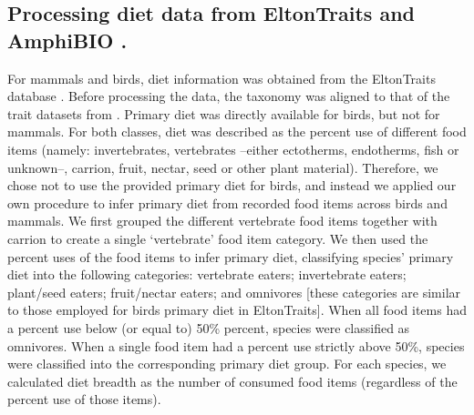\documentclass[11pt]{article}
\begin{document}

\subsection{Processing diet data from EltonTraits \citep{Wilman2014} and AmphiBIO \citep{Oliveira2017}.}
For mammals and birds, diet information was obtained from the EltonTraits database \citep{Wilman2014}. Before processing the data, the taxonomy was aligned to that of the trait datasets from \citep{Etard2020}. Primary diet was directly available for birds, but not for mammals. For both classes, diet was described as the percent use of different food items (namely: invertebrates, vertebrates --either ectotherms, endotherms, fish or unknown--, carrion, fruit, nectar, seed or other plant material). Therefore, we chose not to use the provided primary diet for birds, and instead we applied our own procedure to infer primary diet from recorded food items across birds and mammals. We first grouped the different vertebrate food items together with carrion to create a single `vertebrate' food item category. We then used the percent uses of the food items to infer primary diet, classifying species’ primary diet into the following categories: vertebrate eaters; invertebrate eaters; plant/seed eaters; fruit/nectar eaters; and omnivores [these categories are similar to those employed for birds primary diet in EltonTraits]. When all food items had a percent use below (or equal to) 50\% percent, species were classified as omnivores. When a single food item had a percent use strictly above 50\%, species were classified into the corresponding primary diet group. For each species, we calculated diet breadth as the number of consumed food items (regardless of the percent use of those items). %
\end{document}
